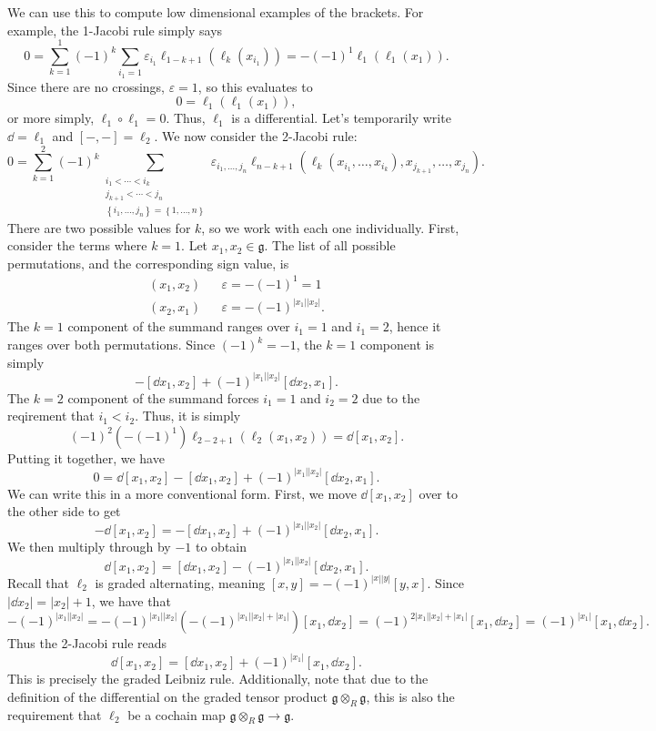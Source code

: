 We can use this to compute low dimensional examples of the brackets. For example, the 1-Jacobi rule simply says
\[
	0 = \sum_{k=1}^{1} (-1)^k\sum_{i_1 = 1} \varepsilon_{i_1} \ell_{1 - k + 1} (\ell_k(x_{i_1})) = -(-1)^{1} \ell _1(\ell _1(x_1))
.\]
Since there are no crossings, $\varepsilon =1$, so this evaluates to
\[
	0 = \ell_1(\ell _1(x_1))
,\]
or more simply, $\ell _1\circ \ell _1=0$. Thus, $\ell _1$ is a differential. Let's temporarily write $\dd =\ell _1$ and $[-,-]=\ell _2$. We now consider the 2-Jacobi rule:
\[
	0=\sum_{k=1}^{2} (-1)^k \sum_{\substack{i_1 < \cdots < i_k \\ j_{k+1} < \cdots < j_n \\ \left\{ i_1, \ldots , j_n \right\} =\left\{ 1, \ldots ,n \right\} }} \varepsilon_{i_1, \ldots ,j_n}  \ell _{n-k+1} (\ell _k(x_{i_1} , \ldots ,x_{i_k} ), x_{j_{k+1} } , \ldots , x_{j_n} )
.\]
There are two possible values for $k$, so we work with each one individually. First, consider the terms where $k=1$. Let $x_1,x_2\in \mathfrak{g} $. The list of all possible permutations, and the corresponding sign value, is
\begin{align*}
	(x_1,x_2) && \varepsilon =-(-1)^1=1\\
	(x_2,x_1) && \varepsilon =-(-1)^{\left| x_1 \right| \left| x_2 \right| } 
.\end{align*}
The $k=1$ component of the summand ranges over $i_1=1$ and $i_1=2$, hence it ranges over both permutations. Since $(-1)^k=-1$, the $k=1$ component is simply
\[
	-[\dd x_1,x_2] + (-1)^{\left| x_1 \right| \left| x_2 \right| } [\dd x_2,x_1]
.\]
The $k=2$ component of the summand forces $i_1=1$ and $i_2=2$ due to the reqirement that $i_1 < i_2$. Thus, it is simply
\[
	(-1)^2(- (-1)^1) \ell_{2-2+1} (\ell _2(x_1,x_2)) = \dd [x_1,x_2]
.\]
Putting it together, we have
\[
	0=\dd [x_1,x_2] - [\dd x_1,x_2] + (-1)^{\left| x_1 \right| \left| x_2 \right| } [\dd x_2,x_1]
.\]
We can write this in a more conventional form. First, we move $\dd[x_1,x_2]$ over to the other side to get
\[
	-\dd [x_1,x_2] = -[\dd x_1,x_2] + (-1)^{\left| x_1 \right| \left| x_2 \right| } [\dd x_2,x_1]
.\]
We then multiply through by $-1$ to obtain
\[
	\dd [x_1,x_2] = [\dd x_1,x_2] - (-1)^{\left| x_1 \right| \left| x_2 \right| } [\dd x_2,x_1] 
.\]
Recall that $\ell _2$ is graded alternating, meaning $[x,y] = -(-1)^{\left| x \right| \left| y \right| } [y,x]$. Since $\left| \dd x_2 \right| =\left| x_2 \right| +1$, we have that
\[
	-(-1)^{\left| x_1 \right| \left| x_2 \right| } =-(-1)^{\left| x_1 \right| \left| x_2 \right| } (-(-1)^{\left| x_1 \right| \left| x_2 \right| +\left| x_1 \right| } )[x_1,\dd x_2]=(-1)^{2\left| x_1 \right| \left| x_2 \right| +\left| x_1 \right| } [x_1,\dd x_2]=(-1)^{\left| x_1 \right| } [x_1,\dd x_2]
.\]
Thus the 2-Jacobi rule reads
\[
	\dd [x_1,x_2] = [\dd x_1,x_2] + (-1)^{\left| x_1 \right| } [x_1,\dd x_2]
.\]
This is precisely the graded Leibniz rule. Additionally, note that due to the definition of the differential on the graded tensor product $\mathfrak{g} \otimes_R \mathfrak{g} $, this is also the requirement that $\ell _2$ be a cochain map $\mathfrak{g} \otimes _R\mathfrak{g} \to \mathfrak{g} $.

